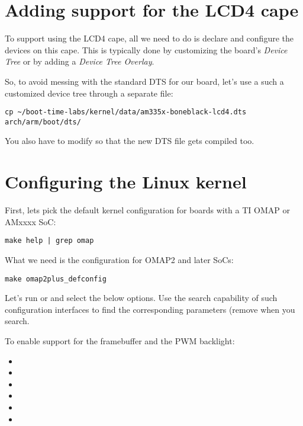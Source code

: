 \section{Adding support for the LCD4 cape}

To support using the LCD4 cape, all we need to do is declare and
configure the devices on this cape. This is typically done by
customizing the board's {\em Device Tree} or by adding a {\em Device
Tree Overlay}.

So, to avoid messing with the standard DTS for our board, let's use a
such a customized device tree through a separate file:

\begin{verbatim}
cp ~/boot-time-labs/kernel/data/am335x-boneblack-lcd4.dts arch/arm/boot/dts/
\end{verbatim}

You also have to modify  so that
the new DTS file gets compiled too.

\section{Configuring the Linux kernel}

First, lets pick the default kernel configuration for boards with a TI
OMAP or AMxxxx SoC:

\begin{verbatim}
make help | grep omap
\end{verbatim}

What we need is the configuration for OMAP2 and later SoCs:
\begin{verbatim}
make omap2plus_defconfig
\end{verbatim}

Let's run  or  and select the
below options. Use the search capability of such configuration
interfaces to find the corresponding parameters (remove 
when you search.

To enable support for the framebuffer and the PWM backlight:
\begin{itemize}
\item {}
\item {}
\item {}
\item {}
\item {}
\item {}
\end{itemize}

